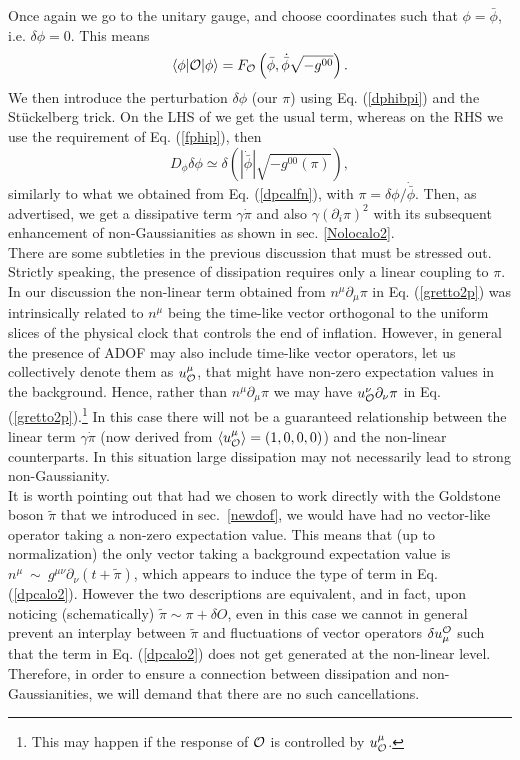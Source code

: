 \documentclass[11pt,amsmath,floats,floatfix,nofootinbib,secnumarabic, superscriptaddress, tightenlines]{revtex4}
\newcommand{\beq}{\begin{equation}}
\newcommand{\eeq}{\end{equation}}
\newcommand{\calo}{{\cal O}}
\newcommand{\bphi}{{\bar\phi}}
\begin{document}
{Once again we go to the unitary gauge, and choose coordinates such that $\phi = \bphi$, i.e. $\delta\phi=0$. This means
\beq
\label{gcalo3}
\langle \phi| \calo |\phi \rangle = F_\calo\left(\bphi,\dot\bphi\sqrt{-g^{00}}\right).
\eeq
We then introduce the perturbation $\delta\phi$ (our $\pi$) using Eq. (\ref{dphibpi}) and the St\"uckelberg trick. On the LHS of we get the usual term, whereas on the RHS we use the requirement of Eq. (\ref{fphip}), then
\beq
D_\phi \delta\phi  \simeq \delta \left(|\dot\bphi| \sqrt{-g^{00}(\pi)}\right),
\eeq
similarly to what we obtained from Eq. (\ref{dpcalfn}),  with $\pi = \delta\phi/\dot\bphi$. Then, as advertised, we get a dissipative term $\gamma \dot\pi$ and also $\gamma (\partial_i\pi)^2$ with its subsequent enhancement of non-Gaussianities as shown in sec. \ref{Nolocalo2}.\\

There are some subtleties in the previous discussion that must be stressed out. Strictly speaking, the presence of dissipation requires
 only a linear coupling to $\pi$. In our discussion the non-linear term obtained from $n^\mu\partial_\mu \pi$ in Eq. (\ref{gretto2p}) was intrinsically related to $n^\mu$ being the time-like vector orthogonal to the uniform slices of the physical clock that controls the end of inflation. However, in general the presence of ADOF may also include time-like vector operators, let us collectively denote them as $u_\calo^\mu$, that might have non-zero expectation values in the background. Hence,
rather than $n^\mu \partial_\mu \pi$ we may have $u_\calo^\nu \partial_\nu \pi$  in Eq. (\ref{gretto2p}).\footnote{This may happen if the response of $\calo$ is controlled
by $u^\mu_\calo$.} In this case there will not be a guaranteed relationship between the linear term $\gamma\dot\pi$ (now derived from $\langle u_\calo^\mu\rangle = (1,0,0,0)$)
 and the non-linear counterparts. In this situation large dissipation may not necessarily lead to strong non-Gaussianity.\\

It is worth pointing out that had we chosen to work directly with the Goldstone boson $\tilde\pi$ that we introduced in sec.~\ref{newdof}, we would have had no vector-like operator taking a non-zero expectation value. This means that (up to normalization) the only vector taking a background expectation value is
 $n^\mu~\sim~g^{\mu\nu}\partial_\nu(t+\tilde\pi)$, which appears to induce the type of term in Eq. (\ref{dpcalo2}). However the two descriptions are equivalent, and in fact, upon noticing (schematically) $\tilde \pi \sim \pi + \delta O$, even in this case we cannot in general prevent an interplay between $\tilde \pi$ and fluctuations of vector operators $\delta u^\calo_\mu$ such that the term in Eq. (\ref{dpcalo2}) does not get generated at the non-linear level. Therefore, in order to ensure a connection between dissipation and non-Gaussianities, we will demand that there are no such cancellations. 
 
}
\end{document}

